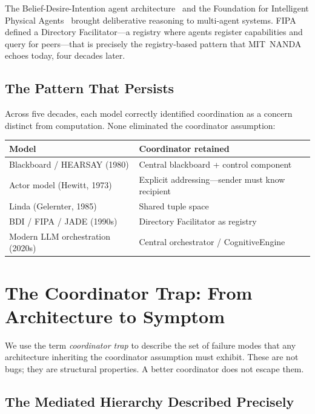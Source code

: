 \documentclass[11pt]{article}
\begin{document}
The Belief-Desire-Intention agent architecture~\cite{bdi} and the Foundation for
Intelligent Physical Agents~\cite{fipa,jade} brought deliberative reasoning to
multi-agent systems. FIPA defined a Directory Facilitator---a registry where
agents register capabilities and query for peers---that is precisely the
registry-based pattern that MIT~NANDA echoes today, four decades later.

\subsection{The Pattern That Persists}

Across five decades, each model correctly identified coordination as a concern
distinct from computation. None eliminated the coordinator assumption:

\begin{center}
\begin{tabular}{ll}
\toprule
\textbf{Model} & \textbf{Coordinator retained} \\
\midrule
Blackboard / HEARSAY (1980) & Central blackboard + control component \\
Actor model (Hewitt, 1973) & Explicit addressing---sender must know recipient \\
Linda (Gelernter, 1985) & Shared tuple space \\
BDI / FIPA / JADE (1990s) & Directory Facilitator as registry \\
Modern LLM orchestration (2020s) & Central orchestrator / CognitiveEngine \\
\bottomrule
\end{tabular}
\end{center}

\section{The Coordinator Trap: From Architecture to Symptom}
\label{sec:trap}

We use the term \emph{coordinator trap} to describe the set of failure modes that
any architecture inheriting the coordinator assumption must exhibit. These are not
bugs; they are structural properties. A better coordinator does not escape them.

\subsection{The Mediated Hierarchy Described Precisely}
\end{document}
